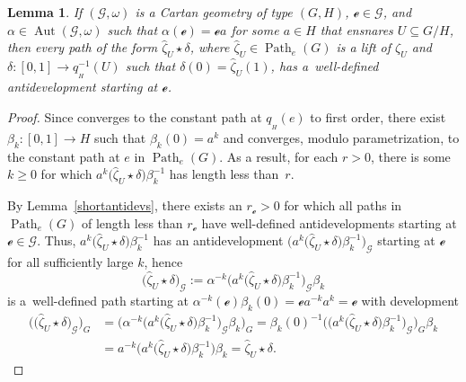\documentclass[10pt,a4paper]{amsart}
\numberwithin{equation}{section}
\newtheorem{Lemma}[Theorem]{Lemma}
\theoremstyle{definition}
\DeclareMathOperator{\Aut}{\mathrm{Aut}}
\DeclareMathOperator{\Path}{Path}
\begin{document}
\begin{Lemma}\label{snarelemma} If $(\mathscr{G},\omega)$ is a Cartan geometry of type $(G,H)$, $\mathscr{e}\in\mathscr{G}$, and $\alpha\in\Aut(\mathscr{G},\omega)$ such that $\alpha(\mathscr{e})=\mathscr{e}a$ for some $a\in H$ that ensnares $U\subseteq G/H$, then every path of the form $\hat{\zeta}_U\star\delta$, where $\hat{\zeta}_U\in\Path_e(G)$ is a lift of $\zeta_U$ and $\delta\colon [0,1]\to q_{{}_H}^{-1}(U)$ such that $\delta(0)=\hat{\zeta}_U(1)$, has a~well-defined antidevelopment  starting at $\mathscr{e}$.\end{Lemma}
\begin{proof}Since  converges to the constant path at $q_{{}_H}(e)$ to first order, there exist $\beta_k\colon [0,1]\to H$ such that $\beta_k(0)=a^k$ and  converges, modulo parametrization, to the constant path at $e$ in $\Path_e(G)$. As a result, for each $r>0$, there is some $k\geq 0$ for which $a^k\bigl(\hat{\zeta}_U\star\delta\bigr)\beta_k^{-1}$ has length less than~$r$.

By Lemma~\ref{shortantidevs}, there exists an $r_\mathscr{e}>0$ for which all paths in $\Path_e(G)$ of length less than $r_\mathscr{e}$ have well-defined antidevelopments starting at $\mathscr{e}\in\mathscr{G}$. Thus, $a^k\bigl(\hat{\zeta}_U\star\delta\bigr)\beta_k^{-1}$ has an antidevelopment $\bigl(a^k\bigl(\hat{\zeta}_U\star\delta\bigr)\beta_k^{-1}\bigr)_\mathscr{G}$ starting at $\mathscr{e}$ for all sufficiently large $k$, hence \[\bigl(\hat{\zeta}_U\star\delta\bigr)_\mathscr{G}:= \alpha^{-k}\bigl(a^k\bigl(\hat{\zeta}_U\star\delta\bigr)\beta_k^{-1}\bigr)_\mathscr{G}\beta_k\] is a~well-defined path starting at $\alpha^{-k}(\mathscr{e})\beta_k(0)=\mathscr{e}a^{-k}a^k=\mathscr{e}$ with development \begin{align*}\bigl(\bigl(\hat{\zeta}_U\star\delta\bigr)_\mathscr{G}\bigr)_G & =\bigl(\alpha^{-k}\bigl(a^k\bigl(\hat{\zeta}_U\star\delta\bigr)\beta_k^{-1}\bigr)_\mathscr{G}\beta_k\bigr)_G
   =\beta_k(0)^{-1}\bigl(\bigl(a^k\bigl(\hat{\zeta}_U\star\delta\bigr)\beta_k^{-1}\bigr)_\mathscr{G}\bigr)_G\beta_k \\
 & =a^{-k}\bigl(a^k\bigl(\hat{\zeta}_U\star\delta\bigr)\beta_k^{-1}\bigr)\beta_k   =\hat{\zeta}_U\star\delta.\tag*{\qed}
 \end{align*}\renewcommand{\qed}{}
 \end{proof}
\end{document}
